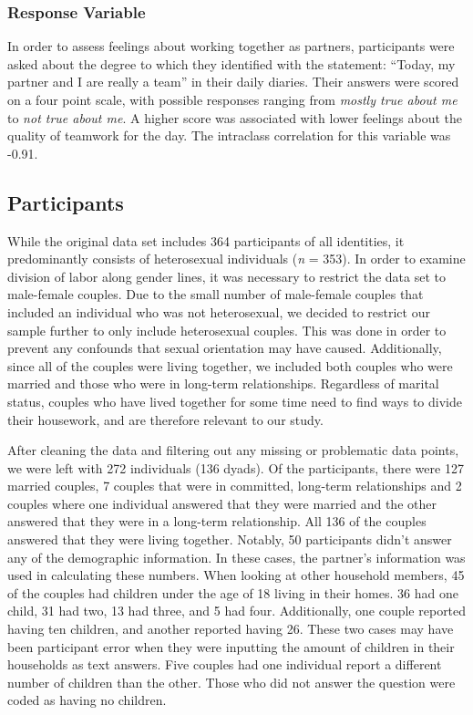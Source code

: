 \documentclass[
  english,
  man,floatsintext]{apa6}
\begin{document}
\hypertarget{response-variable}{%
\subsubsection{Response Variable}\label{response-variable}}

In order to assess feelings about working together as partners, participants were asked about the degree to which they identified with the statement: \enquote{Today, my partner and I are really a team} in their daily diaries. Their answers were scored on a four point scale, with possible responses ranging from \emph{mostly true about me} to \emph{not true about me}. A higher score was associated with lower feelings about the quality of teamwork for the day. The intraclass correlation for this variable was -0.91.

\hypertarget{participants}{%
\subsection{Participants}\label{participants}}

While the original data set includes 364 participants of all identities, it predominantly consists of heterosexual individuals (\emph{n} = 353). In order to examine division of labor along gender lines, it was necessary to restrict the data set to male-female couples. Due to the small number of male-female couples that included an individual who was not heterosexual, we decided to restrict our sample further to only include heterosexual couples. This was done in order to prevent any confounds that sexual orientation may have caused. Additionally, since all of the couples were living together, we included both couples who were married and those who were in long-term relationships. Regardless of marital status, couples who have lived together for some time need to find ways to divide their housework, and are therefore relevant to our study.

After cleaning the data and filtering out any missing or problematic data points, we were left with 272 individuals (136 dyads). Of the participants, there were 127 married couples, 7 couples that were in committed, long-term relationships and 2 couples where one individual answered that they were married and the other answered that they were in a long-term relationship. All 136 of the couples answered that they were living together. Notably, 50 participants didn't answer any of the demographic information. In these cases, the partner's information was used in calculating these numbers. When looking at other household members, 45 of the couples had children under the age of 18 living in their homes. 36 had one child, 31 had two, 13 had three, and 5 had four. Additionally, one couple reported having ten children, and another reported having 26. These two cases may have been participant error when they were inputting the amount of children in their households as text answers. Five couples had one individual report a different number of children than the other. Those who did not answer the question were coded as having no children.
\end{document}
